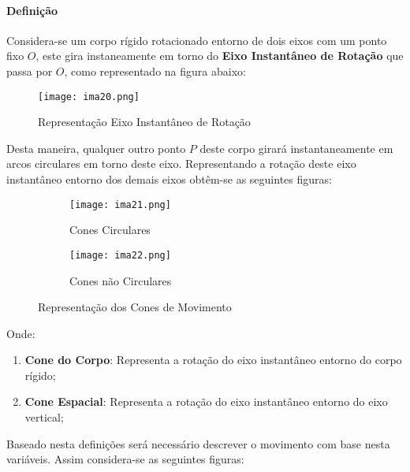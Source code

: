 \documentclass{article}
\begin{document}
            \paragraph{Definição}Considera-se um corpo rígido rotacionado entorno de dois eixos com um ponto fixo $O$, este gira instaneamente em torno do \textbf{Eixo Instantâneo de Rotação} que passa por $O$, como representado na figura abaixo:
                \begin{figure}[H]
                    \centering
                    \texttt{[image: ima20.png]}
                    \caption{Representação Eixo Instantâneo de Rotação}\label{figEixo}
                \end{figure}\noindent
            Desta maneira, qualquer outro ponto $P$ deste corpo girará instantaneamente em arcos circulares em torno deste eixo. Representando a rotação deste eixo instantâneo entorno dos demais eixos obtêm-se as seguintes figuras:
                \begin{figure}[H]
                    \centering
                    \begin{subfigure}[t]{0.45\textwidth}
                        \centering
                        \texttt{[image: ima21.png]}
                        \caption{Cones Circulares}
                    \end{subfigure}
                    \begin{subfigure}[t]{0.45\textwidth}
                        \centering
                        \texttt{[image: ima22.png]}
                        \caption{Cones não Circulares}
                    \end{subfigure}
                    \caption{Representação dos Cones de Movimento}
                \end{figure}\noindent
            Onde:
                \begin{enumerate}[rightmargin = \leftmargin, noitemsep]
                    \item \textbf{Cone do Corpo}: Representa a rotação do eixo instantâneo entorno do corpo rígido;
                    \item \textbf{Cone Espacial}: Representa a rotação do eixo instantâneo entorno do eixo vertical;
                \end{enumerate}
            Baseado nesta definições será necessário descrever o movimento com base nesta variáveis. Assim considera-se as seguintes figuras:
\end{document}
